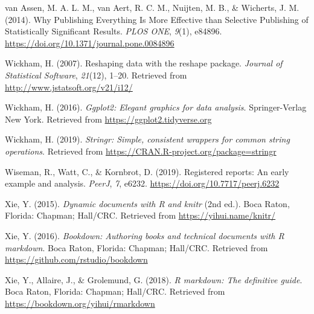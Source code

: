 \documentclass[british,,jou,floatsintext]{apa6}
\begin{document}
\leavevmode\hypertarget{ref-vanAssen2014}{}%
van Assen, M. A. L. M., van Aert, R. C. M., Nuijten, M. B., \& Wicherts, J. M. (2014). Why Publishing Everything Is More Effective than Selective Publishing of Statistically Significant Results. \emph{PLOS ONE}, \emph{9}(1), e84896. \url{https://doi.org/10.1371/journal.pone.0084896}

\leavevmode\hypertarget{ref-R-reshape2}{}%
Wickham, H. (2007). Reshaping data with the reshape package. \emph{Journal of Statistical Software}, \emph{21}(12), 1--20. Retrieved from \url{http://www.jstatsoft.org/v21/i12/}

\leavevmode\hypertarget{ref-R-ggplot2}{}%
Wickham, H. (2016). \emph{Ggplot2: Elegant graphics for data analysis}. Springer-Verlag New York. Retrieved from \url{https://ggplot2.tidyverse.org}

\leavevmode\hypertarget{ref-R-stringr}{}%
Wickham, H. (2019). \emph{Stringr: Simple, consistent wrappers for common string operations}. Retrieved from \url{https://CRAN.R-project.org/package=stringr}

\leavevmode\hypertarget{ref-Wiseman2019}{}%
Wiseman, R., Watt, C., \& Kornbrot, D. (2019). Registered reports: An early example and analysis. \emph{PeerJ}, \emph{7}, e6232. \url{https://doi.org/10.7717/peerj.6232}

\leavevmode\hypertarget{ref-R-knitr}{}%
Xie, Y. (2015). \emph{Dynamic documents with R and knitr} (2nd ed.). Boca Raton, Florida: Chapman; Hall/CRC. Retrieved from \url{https://yihui.name/knitr/}

\leavevmode\hypertarget{ref-R-bookdown}{}%
Xie, Y. (2016). \emph{Bookdown: Authoring books and technical documents with R markdown}. Boca Raton, Florida: Chapman; Hall/CRC. Retrieved from \url{https://github.com/rstudio/bookdown}

\leavevmode\hypertarget{ref-R-rmarkdown}{}%
Xie, Y., Allaire, J., \& Grolemund, G. (2018). \emph{R markdown: The definitive guide}. Boca Raton, Florida: Chapman; Hall/CRC. Retrieved from \url{https://bookdown.org/yihui/rmarkdown}
\end{document}
